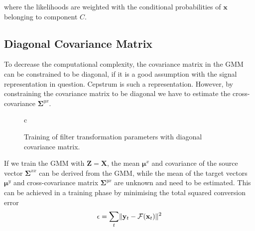 where the likelihoods are weighted with the conditional probabilities of $\mathbf{x}$ belonging to component $C$. 

\subsection{Diagonal Covariance Matrix} %
\label{sub:diagonal_covariance_matrix}
To decrease the computational complexity, the covariance matrix in the GMM can be constrained to be diagonal, if it is a good assumption with the signal representation in question. Cepstrum is such a representation. However, by constraining the covariance matrix to be diagonal we have to estimate the cross-covariance $\mathbf{\Sigma}^{yx}$.

\begin{figure}[htbp]
	\centering
	\begin{tabular}[h]{c}
	\end{tabular}
	\caption{Training of filter transformation parameters with diagonal covariance matrix.}
	\label{fig:VC_training_diag}
\end{figure}

If we train the GMM with $\mathbf{Z}=\mathbf{X}$, the mean $\boldsymbol{\mu}^x$ and covariance of the source vector $\boldsymbol{\Sigma}^{xx}$ can be derived from the GMM, while the mean of the target vectors $\boldsymbol{\mu}^y$ and cross-covariance matrix $\mathbf{\Sigma}^{yx}$ are unknown and need to be estimated. This can be achieved in a training phase by minimising the total squared conversion error
\begin{equation}
	\label{eq:conversion_error}
	\epsilon = \sum_{t} \lVert\mathbf{y}_t - \mathcal{F}(\mathbf{x}_t)\rVert^2
\end{equation}

